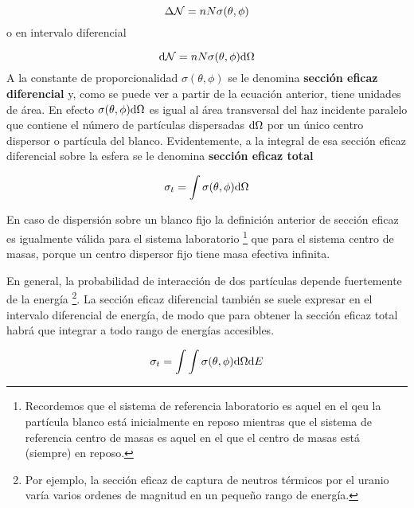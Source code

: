 \begin{equation}
    \Delta \mathcal{N} = n N \sigma (\theta,\phi) 
\end{equation}
o en intervalo diferencial

\begin{equation}
    \mathrm{d} \mathcal{N} = n N \sigma (\theta,\phi) \mathrm{d} \Omega
\end{equation}
A la constante de proporcionalidad $\sigma(\theta,\phi)$ se le denomina \textbf{sección eficaz diferencial} y, como se puede ver a partir de la ecuación anterior, tiene unidades de área. En efecto $\sigma (\theta,\phi)\mathrm{d} \Omega$ es igual al área transversal del haz incidente paralelo que contiene el número de partículas dispersadas $\mathrm{d} \Omega$ por un único centro dispersor  o partícula del blanco. Evidentemente, a la integral de esa sección eficaz diferencial sobre la esfera se le denomina \textbf{sección eficaz total}

\begin{equation}
    \sigma_t = \int \sigma (\theta,\phi) \mathrm{d} \Omega
\end{equation}

En caso de dispersión sobre un blanco fijo la definición anterior de sección eficaz es igualmente válida para el sistema laboratorio \footnote{Recordemos que el sistema de referencia laboratorio es aquel en el qeu la partícula blanco está inicialmente en reposo mientras que el sistema de referencia centro de masas es aquel en el que el centro de masas está (siempre) en reposo.} que para el sistema centro de masas, porque un centro dispersor fijo tiene masa efectiva infinita. 

En general, la probabilidad de interacción de dos partículas depende fuertemente de la energía \footnote{Por ejemplo, la sección eficaz de captura de neutros térmicos por el uranio varía varios ordenes de magnitud en un pequeño rango de energía.}. La sección eficaz diferencial también se suele expresar en el intervalo diferencial de energía, de modo que para obtener la sección eficaz total habrá que integrar a todo rango de energías accesibles.

\begin{equation}
\sigma_t = \int \int \sigma(\theta,\phi) \mathrm{d} \Omega \mathrm{d} E
\end{equation}


